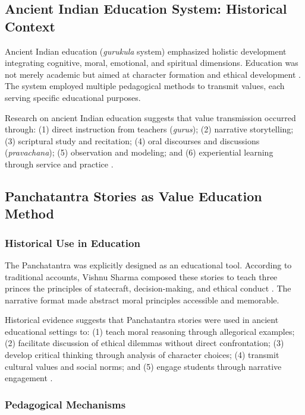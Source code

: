 \documentclass[12pt,a4paper,twocolumn]{article}
\begin{document}
\subsection{Ancient Indian Education System: Historical Context}

Ancient Indian education (\textit{gurukula} system) emphasized holistic development integrating cognitive, moral, emotional, and spiritual dimensions. Education was not merely academic but aimed at character formation and ethical development \citep{Altekar1944}. The system employed multiple pedagogical methods to transmit values, each serving specific educational purposes.

Research on ancient Indian education suggests that value transmission occurred through: (1) direct instruction from teachers (\textit{gurus}); (2) narrative storytelling; (3) scriptural study and recitation; (4) oral discourses and discussions (\textit{pravachana}); (5) observation and modeling; and (6) experiential learning through service and practice \citep{Keay1951, Mookerji1947}.

\subsection{Panchatantra Stories as Value Education Method}

\subsubsection{Historical Use in Education}

The Panchatantra was explicitly designed as an educational tool. According to traditional accounts, Vishnu Sharma composed these stories to teach three princes the principles of statecraft, decision-making, and ethical conduct \citep{Mitra2015}. The narrative format made abstract moral principles accessible and memorable.

Historical evidence suggests that Panchatantra stories were used in ancient educational settings to: (1) teach moral reasoning through allegorical examples; (2) facilitate discussion of ethical dilemmas without direct confrontation; (3) develop critical thinking through analysis of character choices; (4) transmit cultural values and social norms; and (5) engage students through narrative engagement \citep{Edgerton1924}.

\subsubsection{Pedagogical Mechanisms}
\end{document}
